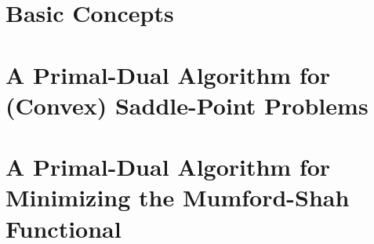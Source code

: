 \documentclass{scrreprt}
\begin{document}
% 
% 
% 
% 

\chapter{Basic Concepts} %
\label{cha:basic_concepts}

    
    
    


\chapter{A Primal-Dual Algorithm for (Convex) Saddle-Point Problems} %
\label{cha:a_first_order_primal_dual_algorithm_for_convex_saddle_point_problems}
    
    
    
    
    
    
    


\chapter{A Primal-Dual Algorithm for Minimizing the Mumford-Shah Functional} %
\label{cha:a_first_order_primal_dual_algorithm_for_minimizing_the_mumford_shah_functional}
    
    
    
    
    










\end{document}
